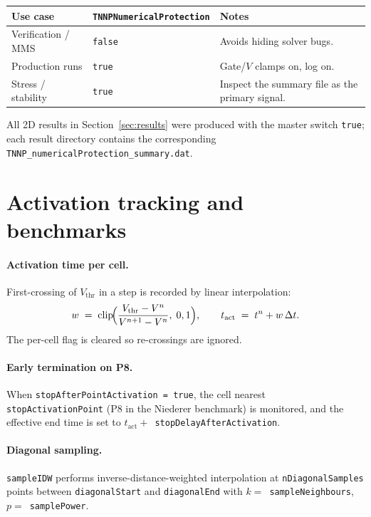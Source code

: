 \documentclass[11pt,a4paper]{article}
\newcommand{\code}[1]{\texttt{\small #1}}
\begin{document}
\begin{center}
\begin{tabular}{@{}lll@{}}
\toprule
Use case & \code{TNNPNumericalProtection} & Notes \\
\midrule
Verification / MMS    & \code{false} & Avoids hiding solver bugs. \\
Production runs       & \code{true}  & Gate/$V$ clamps on, log on. \\
Stress / stability    & \code{true}  & Inspect the summary file
                                       as the primary signal. \\
\bottomrule
\end{tabular}
\end{center}

All 2D results in Section~\ref{sec:results} were produced with the
master switch \code{true}; each result directory contains the
corresponding \code{TNNP\_numericalProtection\_summary.dat}.

\section{Activation tracking and benchmarks}

\paragraph{Activation time per cell.} First-crossing of $V_{\text{thr}}$
in a step is recorded by linear interpolation:
\begin{equation}
  w \;=\; \mathrm{clip}\!\Bigl(
      \frac{V_{\text{thr}} - V^{n}}{V^{n+1} - V^{n}},
      \; 0, 1
    \Bigr),
   \qquad
   t_{\text{act}} \;=\; t^{n} + w\, \Delta t.
\end{equation}
The per-cell flag is cleared so re-crossings are ignored.

\paragraph{Early termination on P8.} When
\code{stopAfterPointActivation = true}, the cell nearest
\code{stopActivationPoint} (P8 in the Niederer benchmark) is monitored,
and the effective end time is set to
$t_{\text{act}} + $~\code{stopDelayAfterActivation}.

\paragraph{Diagonal sampling.} \code{sampleIDW} performs
inverse-distance-weighted interpolation at \code{nDiagonalSamples}
points between \code{diagonalStart} and \code{diagonalEnd} with
$k = $~\code{sampleNeighbours}, $p = $~\code{samplePower}.
\end{document}
